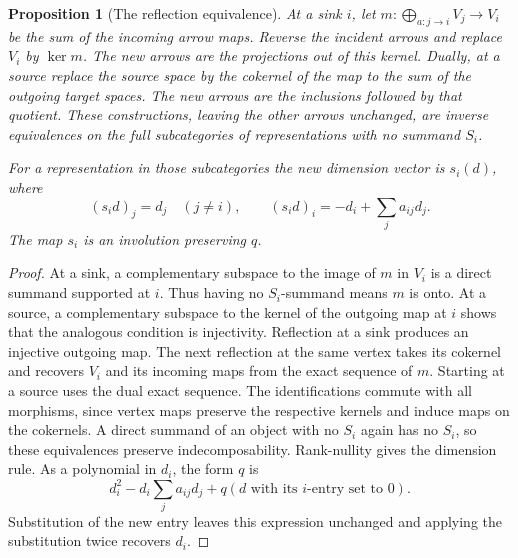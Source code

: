 \documentclass[11pt,oneside,openany]{book}
\newtheorem{proposition}[theorem]{Proposition}
\theoremstyle{definition}
\theoremstyle{remark}
\begin{document}
\begin{proposition}[The reflection equivalence]
\label{res:QU03}
At a sink \(i\), let \(m:\bigoplus_{a:j\to i}V_j\to V_i\)
be the sum of the incoming arrow maps. Reverse the incident arrows
and replace \(V_i\) by \(\ker m\). The new arrows are the
projections out of this kernel. Dually, at a source replace the
source space by the cokernel of the map to the sum of the
outgoing target spaces. The new arrows are the inclusions followed
by that quotient. These constructions, leaving the other arrows
unchanged, are inverse equivalences on the full subcategories
of representations with no summand \(S_i\).

For a representation in those subcategories the new dimension
vector is \(s_i(d)\), where
\[
 (s_i d)_j=d_j\quad(j\ne i),\qquad
 (s_i d)_i=-d_i+\sum_j a_{ij}d_j.
\]
The map \(s_i\) is an involution preserving \(q\).
\end{proposition}
\begin{proof}
At a sink, a complementary subspace to the image of \(m\) in
\(V_i\) is a direct summand supported at \(i\). Thus having no
\(S_i\)-summand means \(m\) is onto. At a source, a complementary
subspace to the kernel of the outgoing map at \(i\) shows that
the analogous condition is injectivity. Reflection at a sink
produces an injective outgoing map. The next reflection at the
same vertex takes its cokernel and recovers \(V_i\) and its
incoming maps from the exact sequence of \(m\). Starting at a
source uses the dual exact sequence. The identifications commute
with all morphisms, since vertex maps preserve the respective
kernels and induce maps on the cokernels. A direct summand of
an object with no \(S_i\) again has no \(S_i\), so these
equivalences preserve indecomposability. Rank-nullity gives the
dimension rule. As a polynomial in \(d_i\), the form \(q\) is
\[
 d_i^2-d_i\sum_j a_{ij}d_j+q(d\text{ with its \(i\)-entry set to }0).
\]
Substitution of the new entry leaves this expression unchanged
and applying the substitution twice recovers \(d_i\).
\end{proof}
\end{document}
